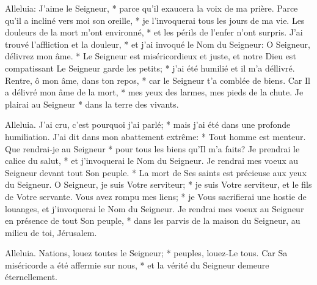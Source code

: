 Alleluia: J'aime le Seigneur, * parce qu'il exaucera la voix de ma prière.
Parce qu'il a incliné vers moi son oreille, * je l'invoquerai tous les jours de ma vie.
Les douleurs de la mort m'ont environné, * et les périls de l'enfer n'ont surpris. J'ai trouvé l'affliction et la douleur, *
et j'ai invoqué le Nom du Seigneur: O Seigneur, délivrez mon âme. *
Le Seigneur est miséricordieux et juste, et notre Dieu est compatissant
Le Seigneur garde les petits; * j'ai été humilié et il m'a déllivré.
Rentre, ô mon âme, dans ton repos, * car le Seigneur t'a comblée de biens.
Car Il a délivré mon âme de la mort, * mes yeux des larmes, mes pieds de la chute.
Je plairai au Seigneur * dans la terre des vivants.

Alleluia.
J'ai cru, c'est pourquoi j'ai parlé; * mais j'ai été dans une profonde humiliation.
J'ai dit dans mon abattement extrême: * Tout homme est menteur.
Que rendrai-je au Seigneur * pour tous les biens qu'Il m'a faits?
Je prendrai le calice du salut, * et j'invoquerai le Nom du Seigneur.
Je rendrai mes voeux au Seigneur devant tout Son peuple. *
La mort de Ses saints est précieuse aux yeux du Seigneur.
O Seigneur, je suis Votre serviteur; * je suis Votre serviteur, et le fils de Votre servante. Vous avez rompu mes liens; *
je Vous sacrifierai une hostie de louanges, et j'invoquerai le Nom du Seigneur.
Je rendrai mes voeux au Seigneur en présence de tout Son peuple, *
dans les parvis de la maison du Seigneur, au milieu de toi, Jérusalem.

Alleluia. Nations, louez toutes le Seigneur; * peuples, louez-Le tous.
Car Sa miséricorde a été affermie sur nous, * et la vérité du Seigneur demeure éternellement.

